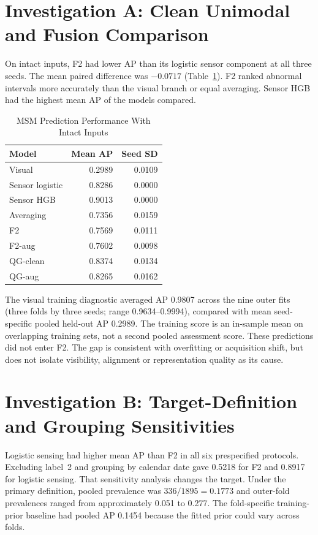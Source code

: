 \section{Investigation A: Clean Unimodal and Fusion Comparison}
\label{sec:msm-clean}
On intact inputs, F2 had lower AP than its logistic sensor component at all three seeds.
The mean paired difference was $-0.0717$ (Table~\ref{tab:msm-clean}). F2 ranked
abnormal intervals more accurately than the visual branch or equal averaging. Sensor HGB
had the highest mean AP of the models compared.

\begin{table}[htbp]
\caption{MSM Prediction Performance With Intact Inputs}\label{tab:msm-clean}
\centering\small

\begin{tabular}{lrr}\hline Model&Mean AP&Seed SD\\\hline
Visual&0.2989&0.0109\\
Sensor logistic&0.8286&0.0000\\
Sensor HGB&0.9013&0.0000\\
Averaging&0.7356&0.0159\\
F2&0.7569&0.0111\\
F2-aug&0.7602&0.0098\\
QG-clean&0.8374&0.0134\\
QG-aug&0.8265&0.0162\\\hline
\end{tabular}
\end{table}

The visual training diagnostic averaged AP 0.9807 across the nine outer fits
(three folds by three seeds; range 0.9634--0.9994), compared with mean seed-specific
pooled held-out AP 0.2989. The training score is an in-sample mean on overlapping training
sets, not a second pooled assessment score. These predictions did not enter F2.
The gap is consistent with overfitting or acquisition shift, but does not isolate
visibility, alignment or representation quality as its cause.

\section{Investigation B: Target-Definition and Grouping Sensitivities}
Logistic sensing had higher mean AP than F2 in all six prespecified protocols. Excluding
label~2 and grouping by calendar date gave 0.5218 for F2 and 0.8917 for logistic
sensing. That sensitivity analysis changes the target. Under the primary definition,
pooled prevalence was $336/1895=0.1773$ and outer-fold prevalences ranged from
approximately 0.051 to 0.277. The fold-specific training-prior baseline had pooled AP
0.1454 because the fitted prior could vary across folds.


